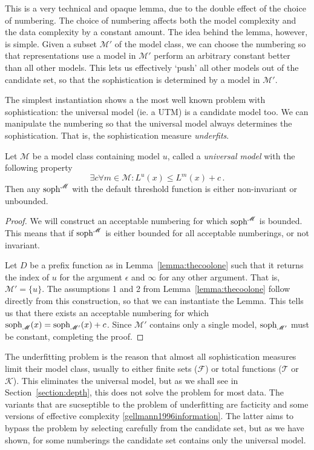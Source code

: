 \documentclass{style/llncs}
\newcommand{\M}{\mathscr M}
\newcommand{\T}{\mathscr T}
\newcommand{\F}{\mathscr F}
\newcommand{\K}{\mathscr K}
\newcommand{\tn}[1]{\textnormal{#1}}
\newcommand{\s}{\tn{soph}}
\newcommand{\p}{\,\text{.}}
\begin{document}
This is a very technical and opaque lemma, due to the double effect of the choice of numbering. The choice of numbering affects both the model complexity and the data complexity by a constant amount. The idea behind the lemma, however, is simple. Given a subset $\M'$ of the model class, we can choose the numbering so that representations use a model in $\M'$ perform an arbitrary constant better than all other models. This lets us effectively `push' all other models out of the candidate set, so that the sophistication is determined by a model in $\M'$.

The simplest instantiation shows a the most well known problem with sophistication: the universal model (ie. a UTM) is a candidate model too. We can manipulate the numbering so that the universal model always determines the sophistication. That is, the sophistication measure \emph{underfits}.

\begin{lemma}[underfitting]
Let $\M$ be a model class containing model $u$, called a \emph{universal model} with the following property
\[
\exists c \forall m \in \M : L^u(x) \leq L^m(x) + c \p
\]  
Then any $\s^\M$ with the default threshold function is either non-invariant or unbounded.
\end{lemma}
\begin{proof}
We will construct an acceptable numbering for which $\s^\M$ is bounded. This means that if $\s^\M$
 is either bounded for all acceptable numberings, or not invariant.
 
Let $D$ be a prefix function as in Lemma~\ref{lemma:thecoolone} such that it returns the index of $u$ for the argument $\epsilon$ and $\infty$ for any other argument. That is, $\M' = \{u\}$. The assumptions 1 and 2 from Lemma~\ref{lemma:thecoolone} follow directly from this construction, so that we can instantiate the Lemma. This tells us that there exists an acceptable numbering for which $\s_\M(x) = \s_{\M'}(x) + c$. Since $\M'$ contains only a single model, $\s_{\M'}$ must be constant, completing the proof.
\end{proof}

The underfitting problem is the reason that almost all sophistication measures limit their model class, usually to either finite sets ($\F$) or total functions ($\T$ or $\K$). This eliminates the universal model, but as we shall see in Section~\ref{section:depth}, this does not solve the problem for most data. The variants that are sucseptible to the problem of underfitting are facticity \cite{adriaans2012facticity} and some versions of effective complexity \ref{gellmann1996information}. The latter aims to bypass the problem by selecting carefully from the candidate set, but as we have shown, for some numberings the candidate set contains only the universal model. 
\end{document}
